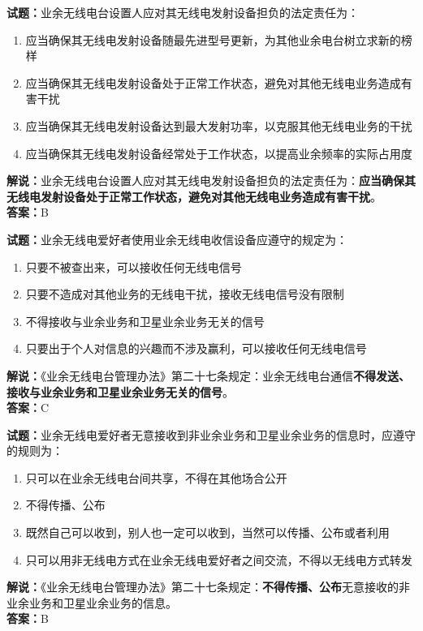 \documentclass{ctexbook}
\begin{document}
\vspace{1em}

\textbf{试题：}业余无线电台设置人应对其无线电发射设备担负的法定责任为：
\begin{enumerate}[leftmargin=3em]
  \item 应当确保其无线电发射设备随最先进型号更新，为其他业余电台树立求新的榜样
  \item 应当确保其无线电发射设备处于正常工作状态，避免对其他无线电业务造成有害干扰
  \item 应当确保其无线电发射设备达到最大发射功率，以克服其他无线电业务的干扰
  \item 应当确保其无线电发射设备经常处于工作状态，以提高业余频率的实际占用度
\end{enumerate}
\noindent\textbf{解说：}业余无线电台设置人应对其无线电发射设备担负的法定责任为：\textbf{应当确保其无线电发射设备处于正常工作状态，避免对其他无线电业务造成有害干扰}。\\\noindent\textbf{答案：}B

\vspace{1em}

\textbf{试题：}业余无线电爱好者使用业余无线电收信设备应遵守的规定为：
\begin{enumerate}[leftmargin=3em]
  \item 只要不被查出来，可以接收任何无线电信号
  \item 只要不造成对其他业务的无线电干扰，接收无线电信号没有限制
  \item 不得接收与业余业务和卫星业余业务无关的信号
  \item 只要出于个人对信息的兴趣而不涉及赢利，可以接收任何无线电信号
\end{enumerate}
\noindent\textbf{解说：}《业余无线电台管理办法》第二十七条规定：业余无线电台通信\textbf{不得发送、接收与业余业务和卫星业余业务无关的信号}。\\\noindent\textbf{答案：}C

\vspace{1em}

\textbf{试题：}业余无线电爱好者无意接收到非业余业务和卫星业余业务的信息时，应遵守的规则为：
\begin{enumerate}[leftmargin=3em]
  \item 只可以在业余无线电台间共享，不得在其他场合公开
  \item 不得传播、公布
  \item 既然自己可以收到，别人也一定可以收到，当然可以传播、公布或者利用
  \item 只可以用非无线电方式在业余无线电爱好者之间交流，不得以无线电方式转发
\end{enumerate}
\noindent\textbf{解说：}《业余无线电台管理办法》第二十七条规定：\textbf{不得传播、公布}无意接收的非业余业务和卫星业余业务的信息。\\\noindent\textbf{答案：}B
\end{document}
